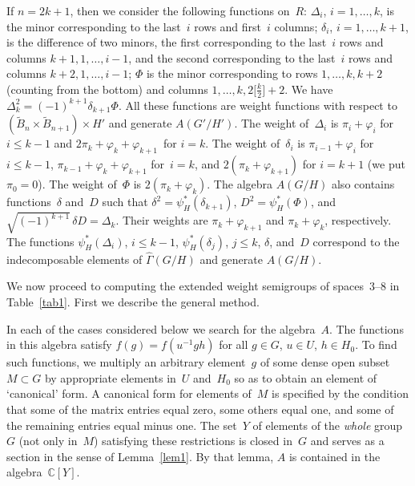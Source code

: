 \documentclass[12pt]{amsart}
\theoremstyle{definition}
\theoremstyle{remark}
\begin{document}
If $n=2k+1$, then we consider the following functions on~$R$:
$\Delta_i$, $i=1,\dots,k$, is the minor corresponding to the
last~$i$ rows and first~$i$ columns; $\delta_i$, $i=1,\dots,k+1$, is
the difference of two minors, the first corresponding to the
last~$i$ rows and columns $k+1,1,\dots,i-1$, and the second
corresponding to the last~$i$ rows and columns $k+2,1,\dots,i-1$;
$\Phi$ is the minor corresponding to rows $1,\dots,k,k+2$ (counting
from the bottom) and columns $1,\dots,k,2\bigl[\frac{k}2\bigr]+2$.
We have $\Delta_k^2=(-1)^{k+1} \delta_{k+1}\Phi$. All these
functions are weight functions with respect to $(\widetilde
B_n\times \widetilde B_{n+1})\times H'$ and generate $A(G'/H')$. The
weight of~$\Delta_i$ is $\pi_i+\varphi_i$ for $i{\leqslant} k-1$ and
$2\pi_k+\varphi_k+\varphi_{k+1}$~for $i=k$. The weight of~$\delta_i$
is $\pi_{i-1}+\varphi_i$ for $i{\leqslant} k-1$,
$\pi_{k-1}+\varphi_k+\varphi_{k+1}$ for~$i=k$, and
$2(\pi_k+\varphi_{k+1})$ for $i=k+1$ (we put $\pi_0=0$). The weight
of~$\Phi$ is $2(\pi_k+\varphi_k)$. The algebra $A(G/H)$ also
contains functions~$\delta$ and~$D$ such that
$\delta^2=\psi_H^*(\delta_{k+1})$, $D^2=\psi_H^*(\Phi)$, and
$\sqrt{(-1)^{k+1}}\,\delta D=\Delta_k$. Their weights are
$\pi_k+\varphi_{k+1}$ and $\pi_k+\varphi_k$, respectively. The
functions $\psi_H^*(\Delta_i)$, $i{\leqslant} k-1$, $\psi_H^*(\delta_j)$,
$j{\leqslant} k$, $\delta$, and~$D$ correspond to the indecomposable
elements of $\widehat\Gamma(G/H)$ and generate $A(G/H)$.

{}{}
\label{ssec3.2} We now proceed to computing the extended weight
semigroups of spaces~3--8 in Table~\ref{tab1}. First we describe the
general method.

In each of the cases considered below we search for the algebra~$A$.
The functions in this algebra satisfy $f(g)=f(u^{-1}gh)$ for all
$g\in G$, $u\in U$, $h\in H_0$. To find such functions, we multiply
an arbitrary element~$g$ of some dense open subset $M\subset G$ by
appropriate elements in~$U$ and~$H_0$ so as to obtain an element of
`canonical' form. A canonical form for elements of~$M$ is specified
by the condition that some of the matrix entries equal zero, some
others equal one, and some of the remaining entries equal minus one.
The set~$Y$ of elements of the \textit{whole} group~$G$ (not only
in~$M$) satisfying these restrictions is closed in~$G$ and serves as
a section in the sense of Lemma~\ref{lem1}. By that lemma, $A$ is
contained in the algebra~$\mathbb{C}[Y]$.
\end{document}
